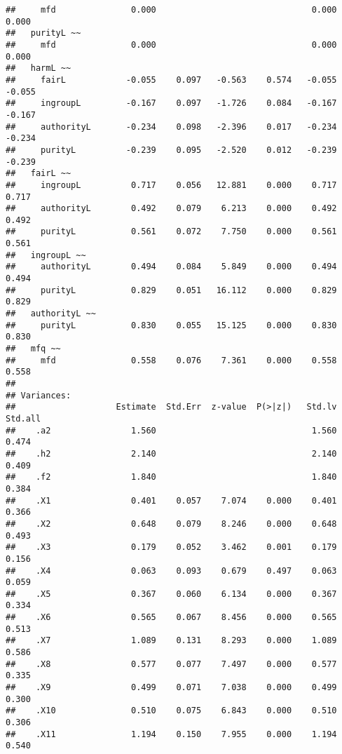 \documentclass[english,man]{apa6}
\newcounter{author}
\theoremstyle{definition}
\theoremstyle{definition}
\theoremstyle{definition}
\theoremstyle{remark}
\begin{document}
\begin{verbatim}
##     mfd               0.000                               0.000    0.000
##   purityL ~~                                                            
##     mfd               0.000                               0.000    0.000
##   harmL ~~                                                              
##     fairL            -0.055    0.097   -0.563    0.574   -0.055   -0.055
##     ingroupL         -0.167    0.097   -1.726    0.084   -0.167   -0.167
##     authorityL       -0.234    0.098   -2.396    0.017   -0.234   -0.234
##     purityL          -0.239    0.095   -2.520    0.012   -0.239   -0.239
##   fairL ~~                                                              
##     ingroupL          0.717    0.056   12.881    0.000    0.717    0.717
##     authorityL        0.492    0.079    6.213    0.000    0.492    0.492
##     purityL           0.561    0.072    7.750    0.000    0.561    0.561
##   ingroupL ~~                                                           
##     authorityL        0.494    0.084    5.849    0.000    0.494    0.494
##     purityL           0.829    0.051   16.112    0.000    0.829    0.829
##   authorityL ~~                                                         
##     purityL           0.830    0.055   15.125    0.000    0.830    0.830
##   mfq ~~                                                                
##     mfd               0.558    0.076    7.361    0.000    0.558    0.558
## 
## Variances:
##                    Estimate  Std.Err  z-value  P(>|z|)   Std.lv  Std.all
##    .a2                1.560                               1.560    0.474
##    .h2                2.140                               2.140    0.409
##    .f2                1.840                               1.840    0.384
##    .X1                0.401    0.057    7.074    0.000    0.401    0.366
##    .X2                0.648    0.079    8.246    0.000    0.648    0.493
##    .X3                0.179    0.052    3.462    0.001    0.179    0.156
##    .X4                0.063    0.093    0.679    0.497    0.063    0.059
##    .X5                0.367    0.060    6.134    0.000    0.367    0.334
##    .X6                0.565    0.067    8.456    0.000    0.565    0.513
##    .X7                1.089    0.131    8.293    0.000    1.089    0.586
##    .X8                0.577    0.077    7.497    0.000    0.577    0.335
##    .X9                0.499    0.071    7.038    0.000    0.499    0.300
##    .X10               0.510    0.075    6.843    0.000    0.510    0.306
##    .X11               1.194    0.150    7.955    0.000    1.194    0.540

\end{verbatim}
\end{document}

